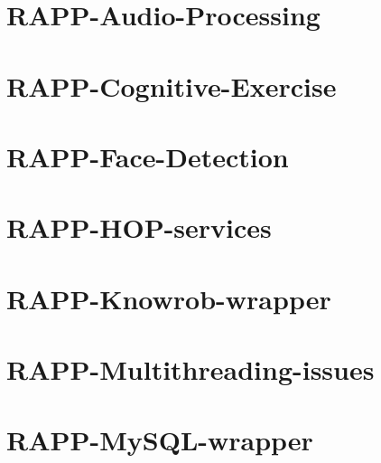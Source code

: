 \documentclass[twoside]{book}
\begin{document}
\chapter{R\-A\-P\-P-\/\-Audio-\/\-Processing}
\label{md_rapp-platform_8wiki_RAPP-Audio-Processing}
\hypertarget{md_rapp-platform_8wiki_RAPP-Audio-Processing}{}

\chapter{R\-A\-P\-P-\/\-Cognitive-\/\-Exercise}
\label{md_rapp-platform_8wiki_RAPP-Cognitive-Exercise}
\hypertarget{md_rapp-platform_8wiki_RAPP-Cognitive-Exercise}{}

\chapter{R\-A\-P\-P-\/\-Face-\/\-Detection}
\label{md_rapp-platform_8wiki_RAPP-Face-Detection}
\hypertarget{md_rapp-platform_8wiki_RAPP-Face-Detection}{}

\chapter{R\-A\-P\-P-\/\-H\-O\-P-\/services}
\label{md_rapp-platform_8wiki_RAPP-HOP-services}
\hypertarget{md_rapp-platform_8wiki_RAPP-HOP-services}{}

\chapter{R\-A\-P\-P-\/\-Knowrob-\/wrapper}
\label{md_rapp-platform_8wiki_RAPP-Knowrob-wrapper}
\hypertarget{md_rapp-platform_8wiki_RAPP-Knowrob-wrapper}{}

\chapter{R\-A\-P\-P-\/\-Multithreading-\/issues}
\label{md_rapp-platform_8wiki_RAPP-Multithreading-issues}
\hypertarget{md_rapp-platform_8wiki_RAPP-Multithreading-issues}{}

\chapter{R\-A\-P\-P-\/\-My\-S\-Q\-L-\/wrapper}
\label{md_rapp-platform_8wiki_RAPP-MySQL-wrapper}
\hypertarget{md_rapp-platform_8wiki_RAPP-MySQL-wrapper}{}

\end{document}
